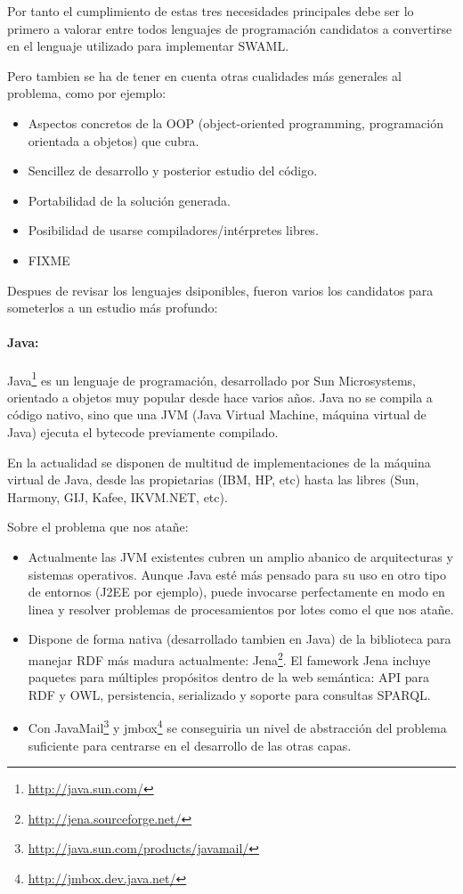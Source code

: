 Por tanto el cumplimiento de estas tres necesidades principales debe ser lo 
primero a valorar entre todos lenguajes de programación candidatos a convertirse 
en el lenguaje utilizado para implementar SWAML. 

Pero tambien se ha de tener en cuenta otras cualidades más generales al problema,
como por ejemplo:

\begin{itemize}
  \item Aspectos concretos de la OOP (object-oriented programming, programación 
	orientada a objetos) que cubra.
  \item Sencillez de desarrollo y posterior estudio del código.
  \item Portabilidad de la solución generada.
  \item Posibilidad de usarse compiladores/intérpretes libres.
  \item FIXME
\end{itemize}

Despues de revisar los lenguajes dsiponibles, fueron varios los candidatos para
someterlos a un estudio más profundo:

\paragraph{Java:}Java\footnote{\url{http://java.sun.com/}} es un lenguaje de 
programación, desarrollado por Sun Microsystems, orientado a objetos muy popular 
desde hace varios años. Java no se compila a código nativo, sino que una JVM 
(Java Virtual Machine, máquina virtual de Java) ejecuta el bytecode previamente 
compilado.

En la actualidad se disponen de multitud de implementaciones de la máquina virtual
de Java, desde las propietarias (IBM, HP, etc) hasta las libres (Sun, Harmony, GIJ, 
Kafee, IKVM.NET, etc).

Sobre el problema que nos atañe:

\begin{itemize}
  \item Actualmente las JVM existentes cubren un amplio abanico de arquitecturas y 
	sistemas operativos. Aunque Java esté más pensado para su uso en otro tipo
	de entornos (J2EE por ejemplo), puede invocarse perfectamente en modo en
	linea y resolver problemas de procesamientos por lotes como el que nos
	atañe.
  \item Dispone de forma nativa (desarrollado tambien en Java) de la biblioteca para
	manejar RDF más madura actualmente: Jena\footnote{\url{http://jena.sourceforge.net/}}.
	El famework Jena incluye paquetes para múltiples propósitos dentro de la web
	semántica: API para RDF y OWL, persistencia, serializado y soporte para consultas
	SPARQL.
  \item Con JavaMail\footnote{\url{http://java.sun.com/products/javamail/}} y
	jmbox\footnote{\url{http://jmbox.dev.java.net/}} se conseguiria un nivel
	de abstracción del problema suficiente para centrarse en el desarrollo
	de las otras capas.
\end{itemize}


